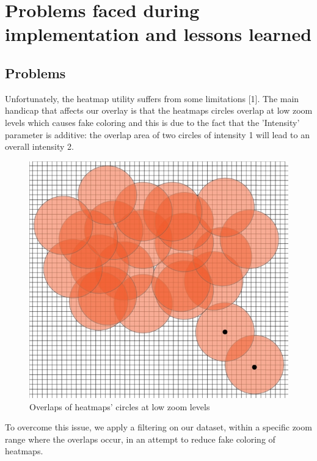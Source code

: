 \documentclass[10pt,a4paper]{article} %
\begin{document}
    

    
    

    \section{Problems faced during implementation and lessons learned}
\subsection{Problems}


Unfortunately, the heatmap utility suffers from some limitations [1]. The main handicap that affects our overlay is that the heatmaps circles overlap at low zoom levels which causes fake coloring and this is due to the fact that the 'Intensity' parameter is additive: the overlap area of two circles of intensity 1 will lead to an overall intensity 2.
    
    \begin{figure}[H]
    \centering
	   
       \includegraphics[scale =0.4]{pic6}
    \caption{Overlaps of heatmaps' circles at low zoom levels}
		  \label{fig:overlaps}
       
    \end{figure}
    \noindent
    To overcome this issue, we apply a filtering on our dataset, within a specific zoom range where the overlaps occur, in an attempt to reduce fake coloring of heatmaps.
\end{document}
